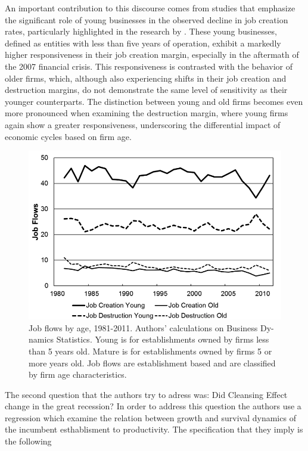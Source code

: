 \documentclass[12pt]{article}
\begin{document}
An important contribution to this discourse comes from studies that emphasize the significant role of young businesses
in the observed decline in job creation rates, particularly highlighted in the research by \cite{fort2013firms}. These young
businesses, defined as entities with less than five years of operation, exhibit a markedly higher responsiveness in
their job creation margin, especially in the aftermath of the 2007 financial crisis. This responsiveness is contrasted
with the behavior of older firms, which, although also experiencing shifts in their job creation and destruction
margins, do not demonstrate the same level of sensitivity as their younger counterparts. The distinction between young
and old firms becomes even more pronounced when examining the destruction margin, where young firms again show a greater
responsiveness, underscoring the differential impact of economic cycles based on firm age. 
\begin{figure}
    \centering
    \includegraphics[scale = 0.54]{Plot1.2.png}
    \caption{Job ﬂows by age, 1981-2011. Authors' calculations on Business Dy-
    namics Statistics. Young is for establishments owned by ﬁrms less than 5 years old.
    Mature is for establishments owned by ﬁrms 5 or more years old. Job ﬂows are
    establishment based and are classiﬁed by ﬁrm age characteristics.
    }
    \label{plot:1.1}
\end{figure} 
The second question that the authors try to adress was: Did Cleansing Effect change in the great recession?
In order to address this question the authors use a regression which examine the relation between growth and survival
dynamics of the incumbent  esthablisment to productivity. The specification that they imply is the following 
\end{document}
